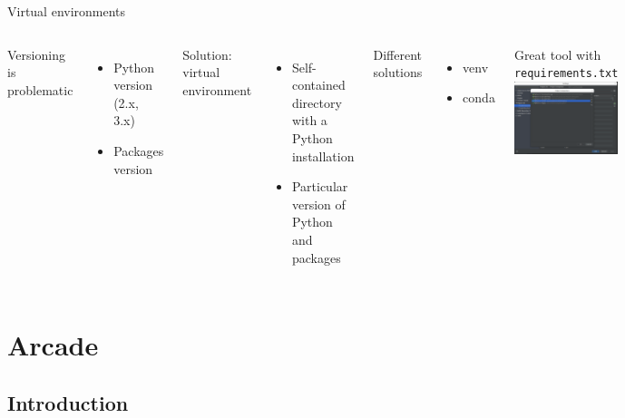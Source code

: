 \documentclass[10pt,compress]{beamer} %
\begin{document}
\begin{frame}{Virtual environments}
	\begin{columns}
            Versioning is problematic
            \begin{itemize}
                \item Python version (2.x, 3.x)
                \item Packages version
            \end{itemize}
            Solution: \alert{virtual environment}
            \begin{itemize}
                \item Self-contained directory with a Python installation
                \item Particular version of Python and packages
            \end{itemize}
        	Different solutions
            \begin{itemize}
                \item venv
                \item conda
            \end{itemize}
            Great tool with \texttt{requirements.txt}
	        \includegraphics[width=\linewidth]{figs/venv.png}\\
	\end{columns}
\end{frame}

\section{Arcade}
\subsection{Introduction}
\end{document}
